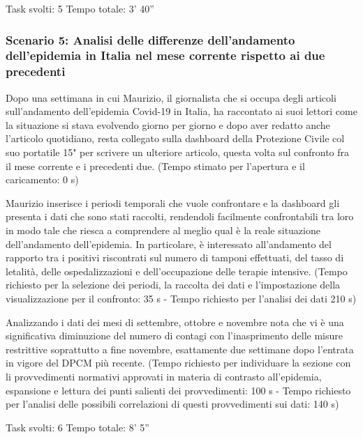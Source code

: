 Task svolti: 5
Tempo totale: 3' 40''

\subsubsection*{Scenario 5: Analisi delle differenze dell'andamento dell'epidemia in Italia nel mese corrente rispetto ai due precedenti}
Dopo una settimana in cui Maurizio, il giornalista che si occupa degli articoli sull'andamento dell'epidemia Covid-19 in Italia, ha raccontato ai suoi lettori come la situazione si stava evolvendo giorno per giorno e dopo aver redatto anche l'articolo quotidiano, resta collegato sulla dashboard della Protezione Civile col suo portatile 15" per scrivere un ulteriore articolo, questa volta sul confronto fra il mese corrente e i precedenti due. (Tempo stimato per l'apertura e il caricamento: 0 s)

Maurizio inserisce i periodi temporali che vuole confrontare e la dashboard gli presenta i dati che sono stati raccolti, rendendoli facilmente confrontabili tra loro in modo tale che riesca a comprendere al meglio qual è la reale situazione dell’andamento dell’epidemia. In particolare, è interessato all'andamento del rapporto tra i positivi riscontrati sul numero di tamponi effettuati, del tasso di letalità, delle ospedalizzazioni e dell'occupazione delle terapie intensive.
(Tempo richiesto per la selezione dei periodi, la raccolta dei dati e l'impostazione della visualizzazione per il confronto: 35 s - Tempo richiesto per l'analisi dei dati 210 s)

Analizzando i dati dei mesi di settembre, ottobre e novembre nota che vi è una significativa diminuzione del numero di contagi con l'inasprimento delle misure restrittive soprattutto a fine novembre, esattamente due settimane dopo l'entrata in vigore del DPCM più recente. (Tempo richiesto per individuare la sezione con li provvedimenti normativi approvati in materia di contrasto all'epidemia, espansione e lettura dei punti salienti dei provvedimenti: 100 s - Tempo richiesto per l'analisi delle possibili correlazioni di questi provvedimenti sui dati: 140 s)

Task svolti: 6
Tempo totale: 8' 5''
